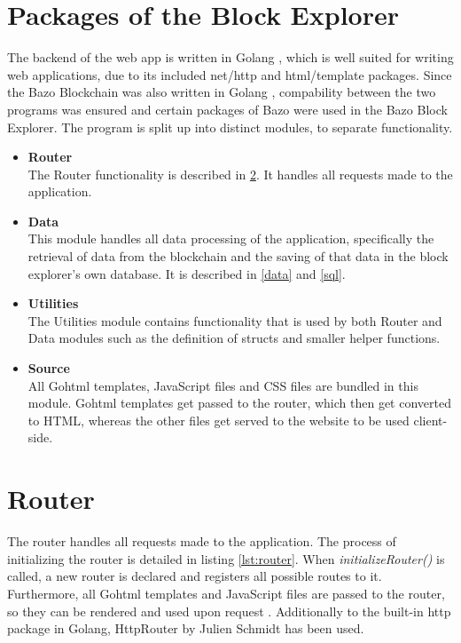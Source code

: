 \section{Packages of the Block Explorer}
The backend of the web app is written in Golang \cite{golang}, which is well suited for writing web applications, due to its included net/http \cite{httppackage} and html/template \cite{template} packages. Since the Bazo Blockchain was also written in Golang \cite{bazo}, compability between the two programs was ensured and certain packages of Bazo were used in the Bazo Block Explorer. The program is split up into distinct modules, to separate functionality. 

\begin{itemize}
\item \textbf{Router}\\
The Router functionality is described in \ref{router}. It handles all requests made to the application.
\item \textbf{Data}\\
This module handles all data processing of the application, specifically the retrieval of data from the blockchain and the saving of that data in the block explorer's own database. It is described in \ref{data} and \ref{sql}.
\item \textbf{Utilities}\\
The Utilities module contains functionality that is used by both Router and Data modules such as the definition of structs and smaller helper functions.
\item \textbf{Source}\\
All Gohtml templates, JavaScript files and CSS files are bundled in this module. Gohtml templates get passed to the router, which then get converted to HTML, whereas the other files get served to the website to be used client-side.
\end{itemize}

\section{Router} \label{router}
The router handles all requests made to the application. The process of initializing the router is detailed in listing \ref{lst:router}. When \emph{initializeRouter()} is called, a new router is declared and registers all possible routes to it. Furthermore, all Gohtml templates and JavaScript files are passed to the router, so they can be rendered and used upon request \cite{httppackage}. 
Additionally to the built-in http package in Golang, HttpRouter by Julien Schmidt \cite{httprouter} has been used. 

